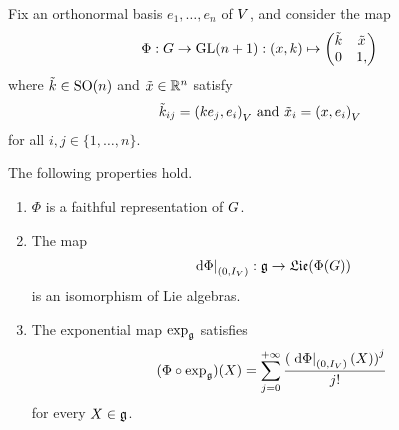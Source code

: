 \begin{proposition}
    Fix an orthonormal basis $e_1, \dots, e_n$ of $V$,
    and consider the map
    \begin{align*}
        \Phi : G \to \mathrm{GL}(n + 1) : (x, k) \mapsto
        \begin{pmatrix}
            \tilde k & \tilde x\\
            0 & 1,
        \end{pmatrix}
    \end{align*}
    where $\tilde k \in {\mathrm{SO} (n)}$ and $\tilde x \in \mathbb{R}^n$ satisfy
    \begin{align*}
        {\tilde k}_{ij} = {\left(k e_j, e_i\right)_{V}} \text{ and } {\tilde x}_i = {\left(x, e_i\right)_{V}}
    \end{align*}
    for all $i, j \in \{1, \dots, n\}$.

    The following properties hold.
    \begin{enumerate}
        \item $\Phi$ is a faithful representation of $G$.
        \item The map
            \begin{align*}
                \left. \,\mathrm{d} \Phi \right|_{(0, {I_{V}})} : \mathfrak{g} \to \mathfrak{Lie}(\Phi(G))
            \end{align*}
            is an isomorphism of Lie algebras.
        \item The exponential map $\exp_{\mathfrak{g}}$ satisfies
            \begin{align*}
                (\Phi \circ \exp_{\mathfrak{g}}) (X) = \sum_{j = 0}^{+\infty} \frac {{(\left. \,\mathrm{d} \Phi \right|_{(0, {I_{V}})}(X))}^j} {j!}
            \end{align*}
            for every $X \in \mathfrak{g}$.
    \end{enumerate}
\end{proposition}
